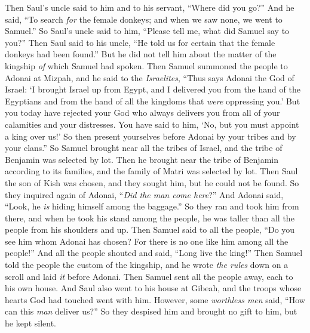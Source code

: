 \begin{biblechapter}
\verse Then Saul’s uncle said to him and to his servant, “Where did you go?” And he said, “To search \textit{for} the female donkeys; and when we saw none, we went to Samuel.”
\verse So Saul’s uncle said to him, “Please tell me, what did Samuel say to you?”
\verse Then Saul said to his uncle, “He told us for certain that the female donkeys had been found.” But he did not tell him about the matter of the kingship \textit{of} which Samuel had spoken.
\verse Then Samuel summoned the people to Adonai at Mizpah,
\verse and he said to the \textit{Israelites}, “Thus says Adonai the God of Israel: ‘I brought Israel up from Egypt, and I delivered you from the hand of the Egyptians and from the hand of all the kingdoms that \textit{were} oppressing you.’
\verse But you today have rejected your God who always delivers you from all of your calamities and your distresses. You have said to him, ‘No, but you must appoint a king over us!’ So then present yourselves before Adonai by your tribes and by your clans.”
\verse So Samuel brought near all the tribes of Israel, and the tribe of Benjamin was selected by lot.
\verse Then he brought near the tribe of Benjamin according to its families, and the family of Matri was selected by lot. Then Saul the son of Kish was chosen, and they sought him, but he could not be found.
\verse So they inquired again of Adonai, “\textit{Did the man come here}?”  And Adonai said, “Look, he \textit{is} hiding himself among the baggage.”
\verse So they ran and took him from there, and when he took his stand among the people, he was taller than all the people from his shoulders and up.
\verse Then Samuel said to all the people, “Do you see him whom Adonai has chosen? For there is no one like him among all the people!” And all the people shouted and said, “Long live the king!”
\verse Then Samuel told the people the custom of the kingship, and he wrote \textit{the rules} down on a scroll and laid \textit{it} before Adonai. Then Samuel sent all the people away, each to his own house.
\verse And Saul also went to his house at Gibeah, and the troops whose hearts God had touched went with him.
\verse However, some \textit{worthless men} said, “How can this \textit{man} deliver us?” So they despised him and brought no gift to him, but he kept silent.
\end{biblechapter}

